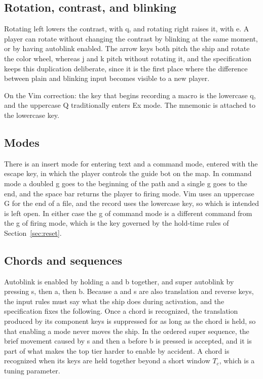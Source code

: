 \documentclass[11pt]{article}
\begin{document}
\subsection{Rotation, contrast, and blinking}

Rotating left lowers the contrast, with q, and rotating right raises it, with e. A player can rotate without changing the contrast by blinking at the same moment, or by having autoblink enabled. The arrow keys both pitch the ship and rotate the color wheel, whereas j and k pitch without rotating it, and the specification keeps this duplication deliberate, since it is the first place where the difference between plain and blinking input becomes visible to a new player.

On the Vim correction: the key that begins recording a macro is the lowercase q, and the uppercase Q traditionally enters Ex mode. The mnemonic is attached to the lowercase key.

\subsection{Modes}

There is an insert mode for entering text and a command mode, entered with the escape key, in which the player controls the guide bot on the map. In command mode a doubled g goes to the beginning of the path and a single g goes to the end, and the space bar returns the player to firing mode. Vim uses an uppercase G for the end of a file, and the record uses the lowercase key, so which is intended is left open. In either case the g of command mode is a different command from the g of firing mode, which is the key governed by the hold-time rules of Section~\ref{sec:reset}.

\subsection{Chords and sequences}

Autoblink is enabled by holding a and b together, and super autoblink by pressing s, then a, then b. Because a and s are also translation and reverse keys, the input rules must say what the ship does during activation, and the specification fixes the following. Once a chord is recognized, the translation produced by its component keys is suppressed for as long as the chord is held, so that enabling a mode never moves the ship. In the ordered super sequence, the brief movement caused by s and then a before b is pressed is accepted, and it is part of what makes the top tier harder to enable by accident. A chord is recognized when its keys are held together beyond a short window $T_c$, which is a tuning parameter.
\end{document}
